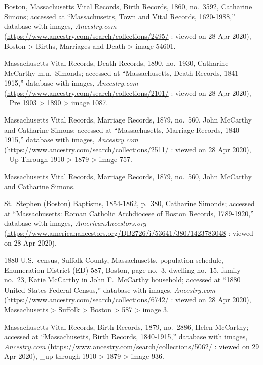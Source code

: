 \begin{thebibliography}{999}
	


Boston, Massachusetts Vital Records, Birth Records, 1860, no.\ 3592, Catharine Simons; accessed at ``Massachusetts, Town and Vital Records, 1620-1988,'' database with images, \textit{Ancestry.com} (\url{https://www.ancestry.com/search/collections/2495/} : viewed on 28 Apr 2020), Boston > Births, Marriages and Death > image 54601.

Massachusetts Vital Records, Death Records, 1890, no.\ 1930, Catharine McCarthy m.n.\ Simonds; accessed at ``Massachusetts, Death Records, 1841-1915,'' database with images, \textit{Ancestry.com} (\url{https://www.ancestry.com/search/collections/2101/} : viewed on 28 Apr 2020), \_Pre 1903 > 1890 > image 1087.

Massachusetts Vital Records, Marriage Records, 1879, no.\ 560, John McCarthy and Catharine Simons; accessed at ``Massachusetts, Marriage Records, 1840-1915,'' database with images, \textit{Ancestry.com} (\url{https://www.ancestry.com/search/collections/2511/} : viewed on 28 Apr 2020), \_Up Through 1910 > 1879 > image 757.

Massachusetts Vital Records, Marriage Records, 1879, no.\ 560, John McCarthy and Catharine Simons.

St.\ Stephen (Boston) Baptisms, 1854-1862, p.\ 380, Catharine Simonds; accessed at ``Massachusetts: Roman Catholic Archdiocese of Boston Records, 1789-1920,'' database with images, \textit{AmericanAncestors.org} (\url{https://www.americanancestors.org/DB2726/i/53641/380/1423783048} : viewed on 28 Apr 2020).

1880 U.S.\ census, Suffolk County, Massachusetts, population schedule, Enumeration District (ED) 587, Boston, page no.\ 3, dwelling no.\ 15, family no.\ 23, Katie McCarthy in John F.\ McCarthy household; accessed at ``1880 United States Federal Census,'' database with images, \textit{Ancestry.com} (\url{https://www.ancestry.com/search/collections/6742/} : viewed on 28 Apr 2020), Massachusetts > Suffolk > Boston > 587 > image 3.

Massachusetts Vital Records, Birth Records, 1879, no.\ 2886, Helen McCarthy; accessed at ``Massachusetts, Birth Records, 1840-1915,'' database with images, \textit{Ancestry.com} (\url{https://www.ancestry.com/search/collections/5062/} : viewed on 29 Apr 2020), \_up through 1910 > 1879 > image 936.


\end{thebibliography}
